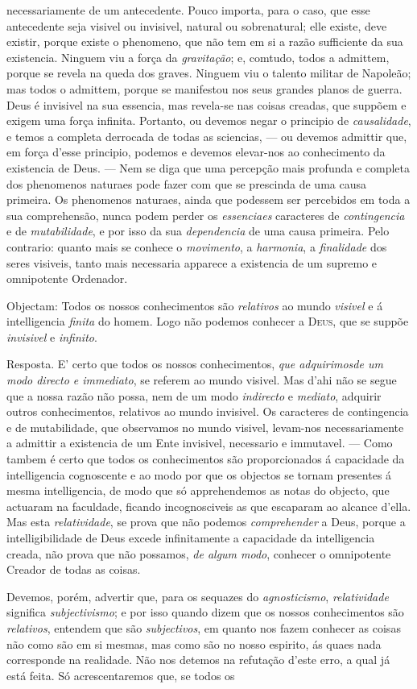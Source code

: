 necessariamente de um antecedente. Pouco importa, para o caso, que esse antecedente seja visivel ou invisivel, natural ou sobrenatural; elle existe, deve existir, porque existe o phenomeno, que não tem em si a razão sufficiente da sua existencia. Ninguem viu a força da \emph{gravitação}; e, comtudo, todos a admittem, porque se revela na queda dos graves. Ninguem viu o talento militar de Napoleão; mas todos o admittem, porque se manifestou nos seus grandes planos de guerra. Deus é invisivel na sua essencia, mas revela-se nas coisas creadas, que suppõem e exigem uma força infinita. Portanto, ou devemos negar o principio de \emph{causalidade}, e temos a completa derrocada de todas as sciencias, --- ou devemos admittir que, em força d'esse principio, podemos e devemos elevar-nos ao conhecimento da existencia de Deus. --- Nem se diga que uma percepção mais profunda e completa dos phenomenos naturaes pode fazer com que se prescinda de uma causa primeira. Os phenomenos naturaes, ainda que podessem ser percebidos em toda a sua comprehensão, nunca podem perder os \emph{essenciaes} caracteres de \emph{contingencia} e de \emph{mutabilidade}, e por isso da sua \emph{dependencia} de uma causa primeira. Pelo contrario: quanto mais se conhece o \emph{movimento}, a \emph{harmonia}, a \emph{finalidade} dos seres visiveis, tanto mais necessaria apparece a existencia de um supremo e omnipotente Ordenador.\par Objectam: Todos os nossos conhecimentos são \emph{relativos} ao mundo \emph{visivel} e á intelligencia \emph{finita} do homem. Logo não podemos conhecer a \textsc{Deus}, que se suppõe \emph{invisivel} e \emph{infinito}.\par Resposta. E' certo que todos os nossos conhecimentos, \emph{que adquirimos}\emph{de um modo directo e immediato}, se referem ao mundo visivel. Mas d'ahi não se segue que a nossa razão não possa, nem de um modo \emph{indirecto} e \emph{mediato}, adquirir outros conhecimentos, relativos ao mundo invisivel. Os caracteres de contingencia e de mutabilidade, que observamos no mundo visivel, levam-nos necessariamente a admittir a existencia de um Ente invisivel, necessario e immutavel. --- Como tambem é certo que todos os conhecimentos são proporcionados á capacidade da intelligencia cognoscente e ao modo por que os objectos se tornam presentes á mesma intelligencia, de modo que só apprehendemos as notas do objecto, que actuaram na faculdade, ficando incognosciveis as que escaparam ao alcance d'ella. Mas esta \emph{relatividade}, se prova que não podemos \emph{comprehender} a Deus, porque a intelligibilidade de Deus excede infinitamente a capacidade da intelligencia creada, não prova que não possamos, \emph{de algum modo}, conhecer o omnipotente Creador de todas as coisas.\par Devemos, porém, advertir que, para os sequazes do \emph{agnosticismo}, \emph{relatividade} significa \emph{subjectivismo}; e por isso quando dizem que os nossos conhecimentos são \emph{relativos}, entendem que são \emph{subjectivos}, em quanto nos fazem conhecer as coisas não como são em si mesmas, mas como são no nosso espirito, ás quaes nada corresponde na realidade. Não nos detemos na refutação d'este erro, a qual já está feita. Só acrescentaremos que, se todos os 
